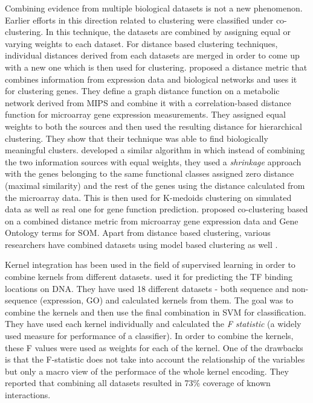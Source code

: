 Combining evidence from multiple biological datasets is not a new phenomenon. Earlier efforts in this direction 
related to clustering were classified under co-clustering. In this technique, the datasets are combined by assigning equal 
or varying weights to each dataset. For distance based clustering techniques, individual distances derived from each datasets 
are merged in order to come up with a new one which is then used for clustering. \citet{Hanisch2002Coclustering} 
proposed a distance metric that combines information from expression data and biological networks and uses it for clustering 
genes. They define a graph distance function on a metabolic network derived from MIPS \citep{Gueldener2006MPact} 
and combine it with a correlation-based distance function for microarray gene expression measurements. They assigned 
equal weights to both the sources and then used the resulting distance for hierarchical clustering. They show that their technique was 
able to find biologically meaningful clusters. \citet{huang2006incorporating} developed a similar algorithm in which 
instead of combining the two information sources with equal weights, they used a \textit{shrinkage} approach with the 
genes belonging to the same functional classes assigned zero distance (maximal similarity) and the rest of the genes using the distance 
calculated from the microarray data. This is then used for K-medoids clustering on simulated data as well as real one for gene function 
prediction. \citet{bramier2007coclustering} proposed co-clustering based on a combined distance metric from microarray 
gene expression data and Gene Ontology terms for \ac{SOM}. Apart from distance based clustering, various researchers have combined datasets 
using model based clustering as well \citep{pan06incorporating}.

Kernel integration has been used in the field of supervised learning in order to combine kernels from different datasets. 
\citet{Holloway2006MachineLearning} used it for predicting the TF binding locations on DNA. They have used 18 different 
datasets - both sequence and non-sequence (expression, GO) and calculated kernels from them. The goal was to combine the kernels and then 
use the final combination in \ac{SVM} for classification. They have used each kernel individually and calculated the \textit{F statistic} 
(a widely used measure for performance of a classifier). In order to combine the kernels, these F values were used as weights 
for each of the kernel. One of the drawbacks is that the F-statistic does not take into account the relationship of the variables but 
only a macro view of the performace of the whole kernel encoding. They reported that combining all datasets resulted in 73\% coverage 
of known interactions. 

